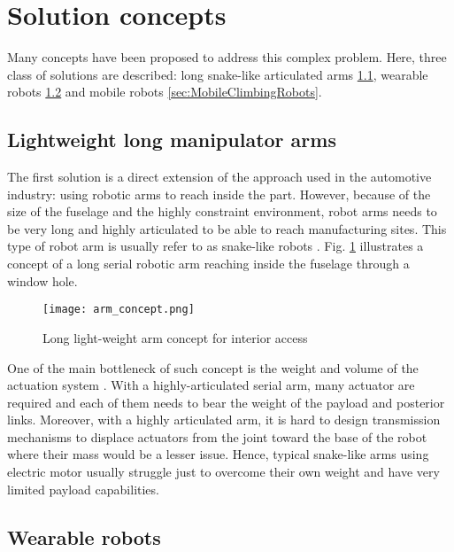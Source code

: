 \section{Solution concepts}

Many concepts have been proposed to address this complex problem. Here, three class of solutions are described: long snake-like articulated arms \ref{sec:LightWeightLongManipulatorArm}, wearable robots \ref{sec:WearableRobots} and mobile robots \ref{sec:MobileClimbingRobots}.

\subsection{Lightweight long manipulator arms}
\label{sec:LightWeightLongManipulatorArm}

The first solution is a direct extension of the approach used in the automotive industry: using robotic arms to reach inside the part. However, because of the size of the fuselage and the highly constraint environment, robot arms needs to be very long and highly articulated to be able to reach manufacturing sites. This type of robot arm is usually refer to as snake-like robots \cite{buckingham_snake-arm_2007}. Fig. \ref{fig:arm_concept} illustrates a concept of a long serial robotic arm reaching inside the fuselage through a window hole.

\begin{figure}[H]
	\centering
		\texttt{[image: arm\_concept.png]}
		\caption{Long light-weight arm concept for interior access}
	\label{fig:arm_concept}
\end{figure}

One of the main bottleneck of such concept is the weight and volume of the actuation system \cite{roy_nonlinear_2009}. With a highly-articulated serial arm, many actuator are required and each of them needs to bear the weight of the payload and posterior links. Moreover, with a highly articulated arm, it is hard to design transmission mechanisms to displace actuators from the joint toward the base of the robot where their mass would be a lesser issue. Hence, typical snake-like arms using electric motor usually struggle just to overcome their own weight and have very limited payload capabilities.


\subsection{Wearable robots}
\label{sec:WearableRobots}

